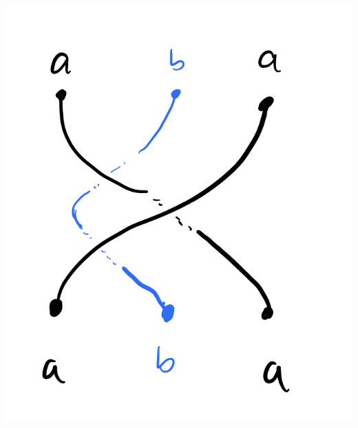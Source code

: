 \begin{center}
    \includegraphics[scale=0.35]{Lectures/Images/lec5-2dbraidexample.png}
\end{center}

